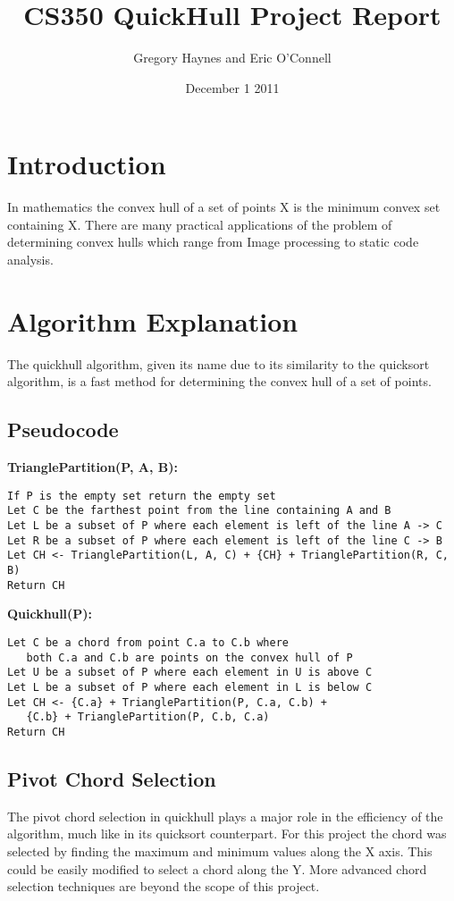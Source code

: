\documentclass[11pt]{article}
\title{CS350 QuickHull Project Report}
\author{Gregory Haynes and Eric O'Connell}
\date{December 1 2011}
\begin{document}
\maketitle

\section{Introduction}

In mathematics the convex hull of a set of points X is the minimum convex set containing X. There are many practical applications of the problem of determining convex hulls which range from Image processing to static code analysis.

\section{Algorithm Explanation}

The quickhull algorithm, given its name due to its similarity to the quicksort algorithm, is a fast method for determining the convex hull of a set of points.

\subsection{Pseudocode}

\textbf{TrianglePartition(P, A, B):}
\begin{verbatim}
If P is the empty set return the empty set
Let C be the farthest point from the line containing A and B
Let L be a subset of P where each element is left of the line A -> C
Let R be a subset of P where each element is left of the line C -> B
Let CH <- TrianglePartition(L, A, C) + {CH} + TrianglePartition(R, C, B)
Return CH
\end{verbatim}
\textbf{Quickhull(P):}
\begin{verbatim}
Let C be a chord from point C.a to C.b where 
   both C.a and C.b are points on the convex hull of P
Let U be a subset of P where each element in U is above C
Let L be a subset of P where each element in L is below C
Let CH <- {C.a} + TrianglePartition(P, C.a, C.b) + 
   {C.b} + TrianglePartition(P, C.b, C.a)
Return CH
\end{verbatim}

\subsection{Pivot Chord Selection}
The pivot chord selection in quickhull plays a major role in the efficiency of the algorithm, much like in its quicksort counterpart. For this project the chord was selected by finding the maximum and minimum values along the X axis. This could be easily modified to select a chord along the Y. More advanced chord selection techniques are beyond the scope of this project.
\end{document}

